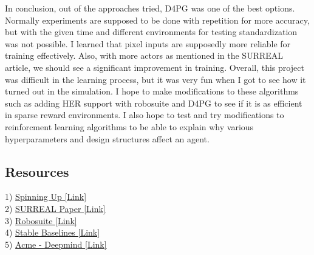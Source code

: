 \documentclass[8pt]{extarticle}
\begin{document}
\begin{adjmulticols}{2}{-1in}{-1in}
In conclusion, out of the approaches tried, D4PG was one of the best options. Normally experiments are supposed to be done with repetition for more accuracy, but with the given time and different environments for testing standardization was not possible. I learned that pixel inputs are supposedly more reliable for training effectively. Also, with more actors as mentioned in the SURREAL article, we should see a significant improvement in training. Overall, this project was difficult in the learning process, but it was very fun when I got to see how it turned out in the simulation. I hope to make modifications to these algorithms such as adding HER support with robosuite and D4PG to see if it is as efficient in sparse reward environments. I also hope to test and try modifications to reinforcment learning algorithms to be able to explain why various hyperparameters and design structures affect an agent.

\end{adjmulticols}

\begin{adjmulticols}{1}{-1in}{-1in}

\section{Resources}

1) \href{https://spinningup.openai.com/en/latest/spinningup/rl_intro.html}{Spinning Up [Link]} \\
2) \href{https://www.cs.utexas.edu/~yukez/publications/papers/fan-surreal-corl18.pdf}{SURREAL Paper [Link]} \\
3) \href{https://robosuite.ai/docs/quickstart.html}{Robosuite [Link]} \\
4) \href{https://stable-baselines.readthedocs.io/en/master/}{Stable Baselines [Link]} \\
5) \href{https://github.com/deepmind/acme}{Acme - Deepmind [Link]}

\end{adjmulticols}
\end{document}
